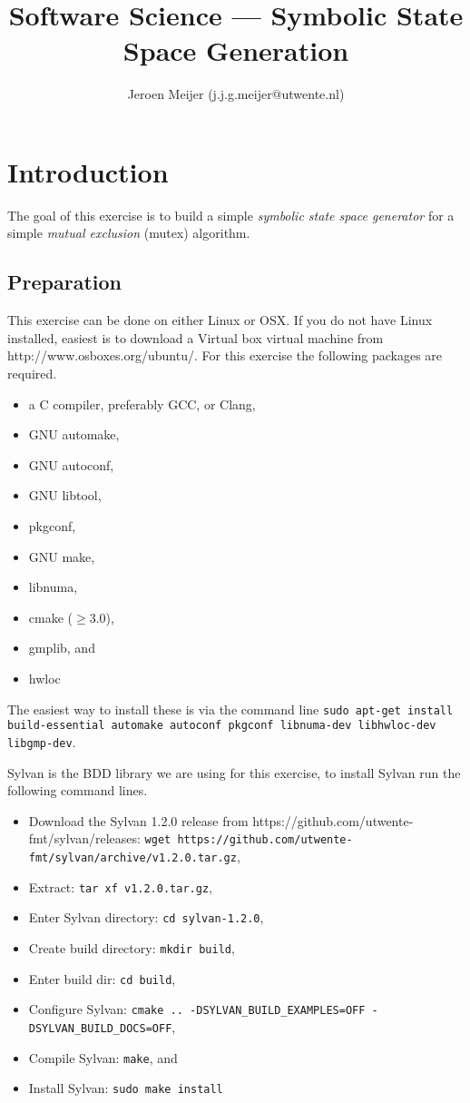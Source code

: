 \documentclass{article}
\begin{document}
\title{Software Science --- Symbolic State Space Generation}

\author{Jeroen Meijer (j.j.g.meijer@utwente.nl)}

\maketitle

\section{Introduction}
The goal of this exercise is to build a simple \emph{symbolic state space generator} for a simple \emph{mutual exclusion} (mutex) algorithm.

\subsection{Preparation}
This exercise can be done on either Linux or OSX.
If you do not have Linux installed, easiest is to download a Virtual box virtual machine from http://www.osboxes.org/ubuntu/.
For this exercise the following packages are required.
\begin{itemize}
    \item a C compiler, preferably GCC, or Clang,
    \item GNU automake,
    \item GNU autoconf,
    \item GNU libtool,
    \item pkgconf,
    \item GNU make,
    \item libnuma,
    \item cmake ($\geq 3.0$),
    \item gmplib, and
    \item hwloc
\end{itemize}

The easiest way to install these is via the command line \texttt{sudo apt-get install build-essential automake autoconf pkgconf libnuma-dev libhwloc-dev libgmp-dev}.

Sylvan is the BDD library we are using for this exercise, to install Sylvan run the following command lines.
\begin{itemize}
    \item Download the Sylvan 1.2.0 release from https://github.com/utwente-fmt/sylvan/releases: \texttt{wget https://github.com/utwente-fmt/sylvan/archive/v1.2.0.tar.gz},
    \item Extract: \texttt{tar xf v1.2.0.tar.gz},
    \item Enter Sylvan directory: \texttt{cd sylvan-1.2.0},
    \item Create build directory: \texttt{mkdir build},
    \item Enter build dir: \texttt{cd build},
    \item Configure Sylvan: \texttt{cmake .. -DSYLVAN\_BUILD\_EXAMPLES=OFF -DSYLVAN\_BUILD\_DOCS=OFF},
    \item Compile Sylvan: \texttt{make}, and
    \item Install Sylvan: \texttt{sudo make install}
\end{itemize}
\end{document}
